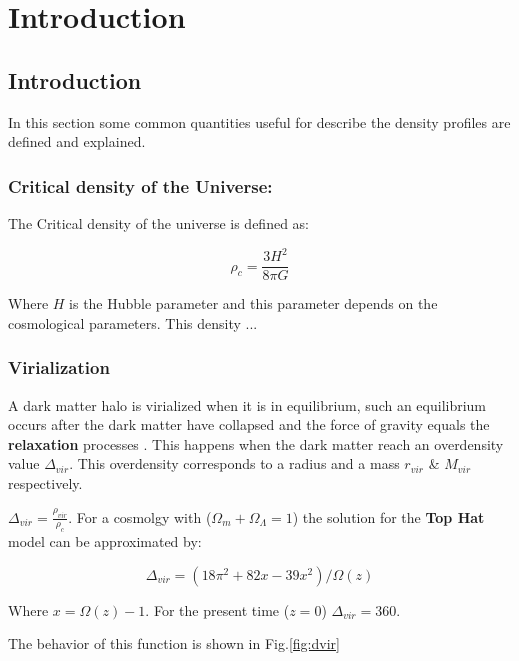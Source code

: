 \chapter{Introduction}
\label{sec:intro}
\section{Introduction}

In this section some common quantities useful for describe the density profiles
are defined and explained.

\subsection{Critical density of the Universe:}

The Critical density of the universe is defined as:

\begin{equation}
\rho_c = \dfrac{3H^2}{8 \pi G}
\end{equation}

Where $H$ is the Hubble parameter and this parameter depends on the cosmological parameters.
This density ...

\subsection{Virialization}

A dark matter halo is virialized when it is in equilibrium, such
an equilibrium occurs after the dark matter have collapsed and
the force of gravity equals the \textbf{relaxation} processes
\citep{BinneyTremaine08}. This happens when the dark matter
reach an overdensity value $\Delta_{vir}$. This overdensity corresponds
to a radius and a mass $r_{vir}$ \& $M_{vir}$ respectively.

 $\Delta_{vir} = \frac{\rho_{vir}}{\rho_c}$.
For a cosmolgy with ($\Omega_m + \Omega_{\Lambda} = 1$) the
solution for the \textbf{Top Hat} model can be  approximated by:

\begin{equation}
\Delta_{vir} = (18 \pi^2 + 82x - 39x^2)/\Omega(z) 
\end{equation}

\citep{EkeColeFrenk96,BryanNorman98} Where $x=\Omega(z)-1$.
For the present time ($z=0$)  $\Delta_{vir}=360$.

The behavior of this function is shown in Fig.\ref{fig:dvir}

